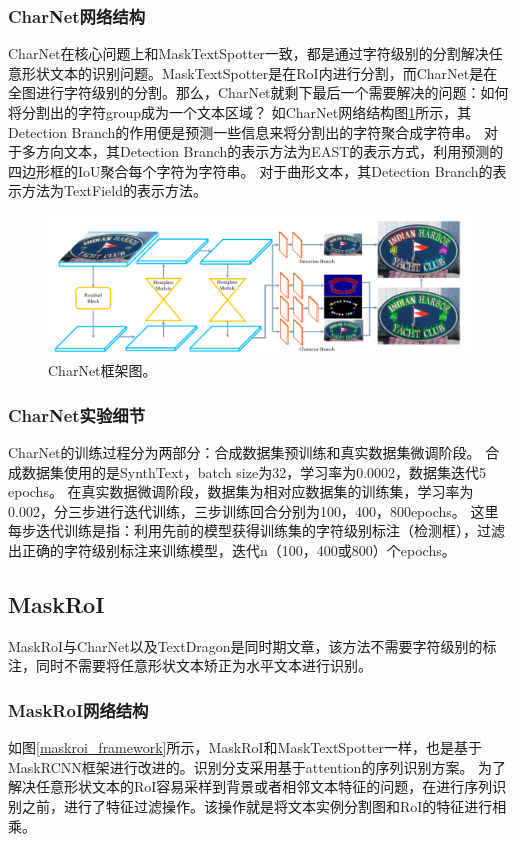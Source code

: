 \subsubsection{CharNet网络结构}
CharNet在核心问题上和MaskTextSpotter一致，都是通过字符级别的分割解决任意形状文本的识别问题。MaskTextSpotter是在RoI内进行分割，而CharNet是在
全图进行字符级别的分割。那么，CharNet就剩下最后一个需要解决的问题：如何将分割出的字符group成为一个文本区域？
如CharNet网络结构图\ref{charnet_framework}所示，其Detection Branch的作用便是预测一些信息来将分割出的字符聚合成字符串。
对于多方向文本，其Detection Branch的表示方法为EAST\cite{zhou2017east}的表示方式，利用预测的四边形框的IoU聚合每个字符为字符串。
对于曲形文本，其Detection Branch的表示方法为TextField\cite{xu2019textfield}的表示方法。
\begin{figure}[htb]
    \centering
    \includegraphics[width=.98\textwidth]{figure/spotting/charnet_framework.png} 
    \caption{CharNet框架图。} 
    \label{charnet_framework} 
\end{figure}

\subsubsection{CharNet实验细节}
CharNet的训练过程分为两部分：合成数据集预训练和真实数据集微调阶段。
合成数据集使用的是SynthText，batch size为32，学习率为0.0002，数据集迭代5 epochs。
在真实数据微调阶段，数据集为相对应数据集的训练集，学习率为0.002，分三步进行迭代训练，三步训练回合分别为100，400，800epochs。
这里每步迭代训练是指：利用先前的模型获得训练集的字符级别标注（检测框），过滤出正确的字符级别标注来训练模型，迭代n（100，400或800）个epochs。

\subsection{MaskRoI}
MaskRoI与CharNet以及TextDragon是同时期文章，该方法不需要字符级别的标注，同时不需要将任意形状文本矫正为水平文本进行识别。
\subsubsection{MaskRoI网络结构}
如图\ref{maskroi_framework}所示，MaskRoI和MaskTextSpotter一样，也是基于MaskRCNN框架进行改进的。识别分支采用基于attention的序列识别方案。
为了解决任意形状文本的RoI容易采样到背景或者相邻文本特征的问题，在进行序列识别之前，进行了特征过滤操作。该操作就是将文本实例分割图和RoI的特征进行相乘。


